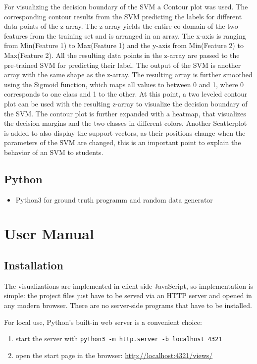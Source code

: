 \documentclass{scrartcl}
\begin{document}
For visualizing the decision boundary of the SVM a Contour plot was used. The corresponding contour results from the SVM predicting the labels for different data points of the z-array. The z-array yields the entire co-domain of the two features from the training set and is arranged in an array. The x-axis is ranging from Min(Feature 1) to Max(Feature 1) and the y-axis from Min(Feature 2) to Max(Feature 2). All the resulting data points in the z-array are passed to the pre-trained SVM for predicting their label. The output of the SVM is another array with the same shape as the z-array. The resulting array is further smoothed using the Sigmoid function, which maps all values to between 0 and 1, where 0 corresponds to one class and 1 to the other. 
At this point, a two leveled contour plot can be used with the resulting z-array  to visualize the decision boundary of the SVM. The contour plot is further expanded with a heatmap, that visualizes the decision margins and the two classes in different colors.
Another Scatterplot is added to also display the support vectors, as their positions change when the parameters of the SVM are changed, this is an important point to explain the behavior of an SVM to students.


\subsection{Python}

\begin{itemize}
	\item Python3 for ground truth programm and random data generator
\end{itemize}

\section{User Manual}

\subsection{Installation}

The visualizations are implemented in client-side JavaScript,
so implementation is simple:
the project files just have to be served via an HTTP server
and opened in any modern browser.
There are no server-side programs that have to be installed.

For local use, Python's built-in web server is a convenient choice:

\begin{enumerate}
	\item start the server with \verb|python3 -m http.server -b localhost 4321|
	\item open the start page in the browser: \url{http://localhost:4321/views/}
\end{enumerate}
\end{document}
